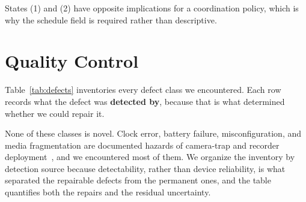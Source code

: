 \documentclass[sigconf]{acmart}
\begin{document}
States (1) and (2) have opposite implications for a coordination policy,
which is why the schedule field is required rather than descriptive.

\section{Quality Control}
\label{sec:qc}

Table~\ref{tab:defects} inventories every defect class we encountered.
Each row records what the defect was \textbf{detected by}, because that
is what determined whether we could repair it.

None of these classes is novel. Clock error, battery failure,
misconfiguration, and media fragmentation are documented hazards of
camera-trap and recorder
deployment~\cite{lahozmonfort2021monitoring,ahumada2020wildlifeinsights,Pestell2025SmartCamera},
and we encountered most of them. We organize the inventory by detection
source because detectability, rather than device reliability, is what
separated the repairable defects from the permanent ones, and the table
quantifies both the repairs and the residual uncertainty.
\end{document}
